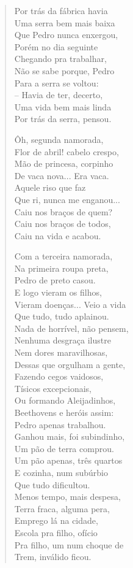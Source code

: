 \begin{verse}
Por trás da fábrica havia\\
Uma serra bem mais baixa\\
Que Pedro nunca enxergou,\\
Porém no dia seguinte\\
Chegando pra trabalhar,\\
Não se sabe porque, Pedro\\
Para a serra se voltou:\\
-- Havia de ter, decerto,\\
Uma vida bem mais linda\\
Por trás da serra, pensou.

Ôh, segunda namorada,\\
Flor de abril! cabelo crespo,\\
Mão de princesa, corpinho\\
De vaca nova... Era vaca.\\
Aquele riso que faz\\
Que ri, nunca me enganou...\\
Caiu nos braços de quem?\\
Caiu nos braços de todos,\\
Caiu na vida e acabou.

Com a terceira namorada,\\
Na primeira roupa preta,\\
Pedro de preto casou.\\
E logo vieram os filhos,\\
Vieram doenças... Veio a vida\\
Que tudo, tudo aplainou.\\
Nada de horrível, não pensem,\\
Nenhuma desgraça ilustre\\
Nem dores maravilhosas,\\
Dessas que orgulham a gente,\\
Fazendo cegos vaidosos,\\
Tísicos excepcionais,\\
Ou formando Aleijadinhos,\\
Beethovens e heróis assim:\\
Pedro apenas trabalhou.\\
Ganhou mais, foi subindinho,\\
Um pão de terra comprou.\\
Um pão apenas, três quartos\\
E cozinha, num subúrbio\\
Que tudo dificultou.\\
Menos tempo, mais despesa,\\
Terra fraca, alguma pera,\\
Emprego lá na cidade,\\
Escola pra filho, ofício\\
Pra filho, um num choque de\\
Trem, inválido ficou.


\end{verse}
